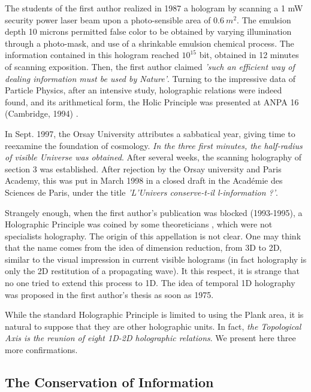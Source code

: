 \documentclass[twoside,draft]{article}
\begin{document}
\begin{sloppypar}
The students of the first author realized in 1987 a hologram by scanning a 1 mW security power laser beam upon a photo-sensible area of $0.6~ m^2$. The emulsion depth 10 microns permitted false color to be obtained by varying illumination through a photo-mask, and use of a shrinkable emulsion chemical process. The information contained in this hologram reached $10^{15}$ bit, obtained in 12 minutes of scanning exposition. Then, the first author claimed \textit{'such an efficient way of dealing information must be used by Nature'}. Turning to the impressive data of Particle Physics, after an intensive study, holographic relations were indeed found, and its arithmetical form, the Holic Principle was presented at ANPA 16 (Cambridge, 1994) \cite{Sanchez4}. 

In Sept. 1997, the Orsay University attributes a sabbatical year, giving time to reexamine the foundation of cosmology. \textit{In the three first minutes, the half-radius of visible Universe was obtained}. After several weeks, the scanning holography of section 3 was established. After rejection by the Orsay university and Paris Academy, this was put in March 1998 in a closed draft in the Acad\'{e}mie des Sciences de Paris, under the title \textit{ 'L'Univers conserve-t-il l-information ?'}.

Strangely enough, when the first author's publication was blocked (1993-1995), a Holographic Principle was coined by some theoreticians \cite{Bousso}, which were not specialists holography. The origin of this appellation is not clear. One may think that the name comes from the idea of dimension reduction, from 3D to 2D, similar to the visual impression in current visible holograms (in fact holography is only the 2D restitution of a propagating wave). It this respect, it is strange that no one tried to extend this process to 1D. The idea of temporal 1D holography was proposed in the first author's thesis as soon as 1975. 

While the standard Holographic Principle is limited to using the Plank area, it is natural to suppose that they are other holographic units. In fact, \textit{the Topological Axis is the reunion of eight 1D-2D holographic relations}. We present here three more confirmations. 

\subsection{The Conservation of Information}


\end{sloppypar}
\end{document}
